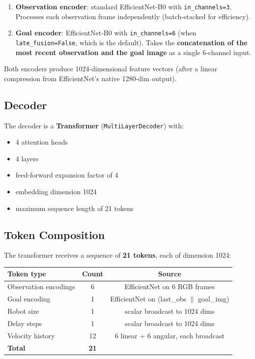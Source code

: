 \documentclass[11pt,a4paper]{article}
\begin{document}
\begin{enumerate}[nosep]
  \item \textbf{Observation encoder}: standard EfficientNet-B0 with
    \texttt{in\_channels=3}.  Processes each observation frame independently
    (batch-stacked for efficiency).
  \item \textbf{Goal encoder}: EfficientNet-B0 with \texttt{in\_channels=6}
    (when \texttt{late\_fusion=False}, which is the default).  Takes the
    \textbf{concatenation of the most recent observation and the goal image}
    as a single 6-channel input.
\end{enumerate}

Both encoders produce 1024-dimensional feature vectors (after a linear
compression from EfficientNet's native 1280-dim output).

\subsection{Decoder}

The decoder is a \textbf{Transformer} (\texttt{MultiLayerDecoder}) with:
\begin{itemize}[nosep]
  \item 4 attention heads
  \item 4 layers
  \item feed-forward expansion factor of 4
  \item embedding dimension 1024
  \item maximum sequence length of 21 tokens
\end{itemize}

\subsection{Token Composition}

The transformer receives a sequence of \textbf{21 tokens}, each of dimension
1024:

\begin{center}
\begin{tabular}{lcc}
\toprule
\textbf{Token type} & \textbf{Count} & \textbf{Source} \\
\midrule
Observation encodings & 6 & EfficientNet on 6 RGB frames \\
Goal encoding & 1 & EfficientNet on (last\_obs $\|$ goal\_img) \\
Robot size & 1 & scalar broadcast to 1024 dims \\
Delay steps & 1 & scalar broadcast to 1024 dims \\
Velocity history & 12 & 6 linear + 6 angular, each broadcast \\
\midrule
\textbf{Total} & \textbf{21} & \\
\bottomrule
\end{tabular}
\end{center}
\end{document}

